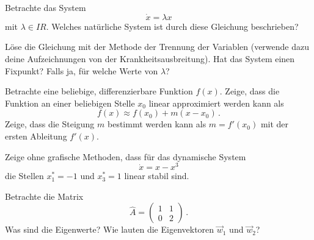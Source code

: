   \exercise[topic=Lineare Stabilit\"at]
  \subexercise
  Betrachte das System
  \begin{equation}
      \dot x = \lambda x
  \end{equation}
  mit $\lambda\in I\!\!R$. Welches nat\"urliche System ist durch diese Gleichung beschrieben?

  L\"ose die Gleichung 
  mit der Methode der Trennung der Variablen (verwende dazu deine Aufzeichnungen
  von der Krankheitsausbreitung). 
  Hat das System einen Fixpunkt? Falls ja, f\"ur welche Werte von
  $\lambda$? 

  \subexercise
  Betrachte eine beliebige, differenzierbare Funktion $f(x)$. Zeige,
  dass die Funktion an einer beliebigen Stelle $x_0$ linear approximiert werden
  kann als
  \begin{equation}
      f(x) \approx f(x_0) + m(x-x_0)\,.
  \end{equation}
  Zeige, dass die Steigung $m$ bestimmt werden kann als $m=f'(x_0)$ mit
  der ersten Ableitung $f'(x)$.

  \subexercise
  Zeige ohne grafische Methoden, dass f\"ur das dynamische System 
  \begin{equation}
      \dot x = x-x^3
  \end{equation}
  die Stellen $x^*_1=-1$ und $x^*_3=1$ linear stabil sind.

  \exercise[topic=Eigenwerte und Eigenvektoren]
  \subexercise
  Betrachte die Matrix
  \begin{equation}
      \hat A = \begin{pmatrix} 1 & 1 \\ 0 & 2\end{pmatrix}\,.
  \end{equation}
  Was sind die Eigenwerte? Wie lauten die Eigenvektoren $\vec w_1$ und
  $\vec w_2$?
  
